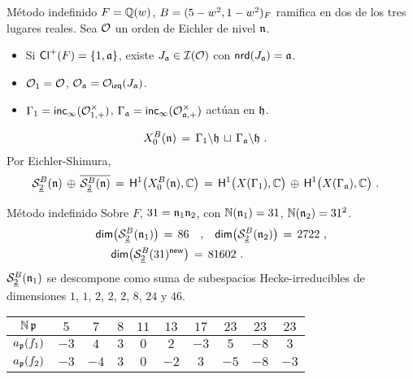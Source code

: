 \begin{frame}{M\'{e}todo indefinido}
	$F=\bb Q(w)$, %
	$B=\quatalg[F]{5-w^2,1-w^2}$ ramifica en dos de los tres lugares
	reales. Sea $\cal O$ un orden de Eichler de nivel $\frak n$.
	\begin{itemize}
		\item Si $\pClass{F}=\{1,\frak a\}$, existe
			$J_{\frak a}\in\ideales{\cal O}$ con
			$\nrd(J_{\frak a})=\frak a$.
		\item $\cal O_1=\cal O$, $\cal O_{\frak a}=\Oizq(J_{\frak a})$.
		\item $\Gamma_1=\inc[\infty](\cal O_{1,+}^\times)$,
			\begin{math}
				\Gamma_{\frak a}=
					\inc[\infty](\cal O_{\frak a,+}^\times)
			\end{math} act\'{u}an en $\hP$.
	\end{itemize}
	\begin{align*}
		X_0^B(\frak n) & \,=\,\Gamma_1\backslash\hP
			\,\sqcup\,\Gamma_{\frak a}\backslash\hP
		\text{ .}
	\end{align*}
	Por Eichler-Shimura,
	\begin{align*}
		\spitzH[B]2{\frak n}\,\oplus\,\lconj{\spitzH[B]2{\frak n}}
			& \,=\,\mathsf H^1\big(X_0^B(\frak n),\bb C\big)
			\,=\,\mathsf H^1\big(X(\Gamma_1),\bb C\big)\,\oplus\,
				\mathsf H^1\big(X(\Gamma_{\frak a}),\bb C\big)
		\text{ .}
	\end{align*}
\end{frame}

\begin{frame}{M\'{e}todo indefinido}
	Sobre $F$, $31=\frak n_1\frak n_2$, con $\idnorm(\frak n_1)=31$,
	$\idnorm(\frak n_2)=31^2$.
	\begin{align*}
		\dim{\spitzH[B]2{\frak n_1}} \,=\, 86 & \quad\text{,}\quad
		\dim{\spitzH[B]2{\frak n_2}} \,=\, 2722 \text{ ,} \\
		\dim{\spitzH[B]2{31}^\neue} & \,=\, 81602 \text{ .}
	\end{align*}
	$\spitzH[B]2{\frak n_1}$ se descompone como suma de subespacios
	Hecke-irreducibles de dimensiones $1$, $1$, $2$, $2$, $2$, $8$, $24$ y
	$46$.
	\begin{center}
		\begin{tabular}{c|ccccccccc}
			$\idnorm\,\frak p$ & $5$ & $7$ &
				$8$ & $11$ & $13$ & $17$ & $23$ & $23$ & $23$
					\\
			\hline
			$a_{\frak p}(f_1)$ & $-3$ & $4$ &
				$3$ & $0$ & $2$ & $-3$ & $5$ & $-8$ & $3$ \\
			$a_{\frak p}(f_2)$ & $-3$ & $-4$ &
				$3$ & $0$ & $-2$ & $3$ & $-5$ & $-8$ & $-3$
		\end{tabular}
	\end{center}
\end{frame}
